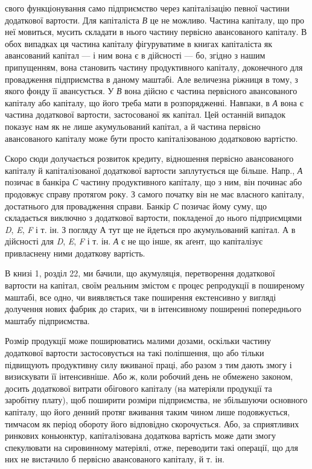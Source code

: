 \parcont{}  %
свого функціонування само підприємство через капіталізацію певної частини
додаткової вартости. Для капіталіста \emph{В} це не можливо. Частина
капіталу, що про неї мовиться, мусить складати в нього частину первісно
авансованого капіталу. В обох випадках ця частина капіталу фігуруватиме
в книгах капіталіста як авансований капітал — і ним вона є в
дійсності — бо, згідно з нашим припущенням, вона становить частину
продуктивного капіталу, доконечного для провадження підприємства
в даному маштабі. Але величезна ріжниця в тому, з якого фонду
її авансується. У \emph{В} вона дійсно є частина первісного авансованого
капіталу або капіталу, що його треба мати в розпорядженні.
Навпаки, в \emph{А} вона є частина додаткової вартости, застосованої як
капітал. Цей останній випадок показує нам як не лише акумульований
капітал, а й частина первісно авансованого капіталу може бути просто
капіталізованою додатковою вартістю.

Скоро сюди долучається розвиток кредиту, відношення первісно авансованого
капіталу й капіталізованої додаткової вартости заплутується
ще більше. Напр., \emph{А} позичає в банкіра \emph{С} частину продуктивного капіталу,
що з ним, він починає або продовжує справу протягом року. З
самого початку він не має власного капіталу, достатнього для провадження
справи. Банкір \emph{С} позичає йому суму, що складається виключно з
додаткової вартости, покладеної до нього підприємцями \emph{D}, \emph{E}, \emph{F} і т. ін.
З погляду А тут ще не йдеться про акумульований капітал. А в дійсності
для \emph{D}, \emph{E}, \emph{F} і т. ін. \emph{А} є не що інше, як аґент, що капіталізує привласнену
ними додаткову вартість.

В книзі 1, розділ 22, ми бачили, що акумуляція, перетворення додаткової
вартости на капітал, своїм реальним змістом є процес репродукції
в поширеному маштабі, все одно, чи виявляється таке поширення
екстенсивно у вигляді долучення нових фабрик до старих, чи в інтенсивному
поширенні попереднього маштабу підприємства.

Розмір продукції може поширюватись малими дозами, оскільки
частину додаткової вартости застосовується на такі поліпшення, що або
тільки підвищують продуктивну силу вживаної праці, або разом з тим
дають змогу і визискувати її інтенсивніше. Або ж, коли робочий день не
обмежено законом, досить додаткової витрати обігового капіталу (на матеріяли
продукції та заробітну плату), щоб поширити розміри підприємства,
не збільшуючи основного капіталу, що його денний протяг вживання
таким чином лише подовжується, тимчасом як період обороту його
відповідно скорочується. Або, за сприятливих ринкових коньюнктур, капіталізована
додаткова вартість може дати змогу спекулювати на сировинному
матеріялі, отже, переводити такі операції, що для них не вистачило
б первісно авансованого капіталу, й т. ін.

